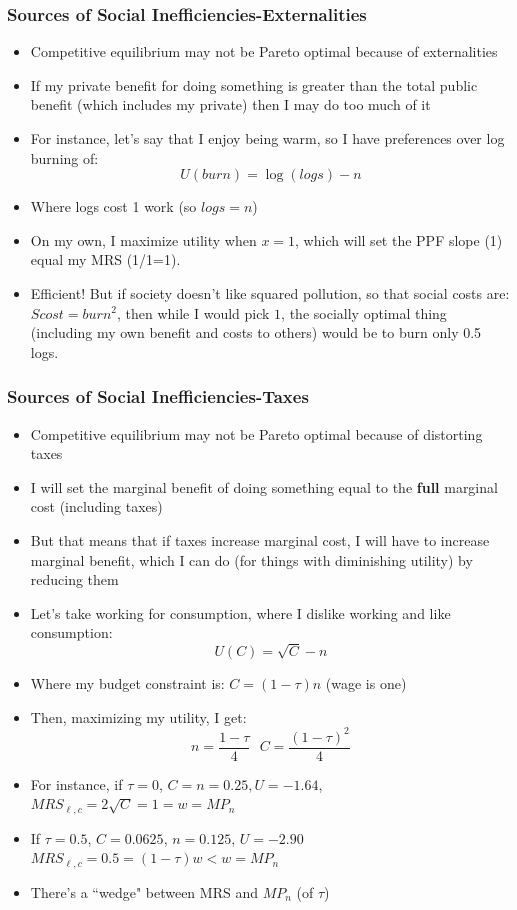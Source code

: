 \documentclass{beamer}
\begin{document}
\begin{frame}
\frametitle[alignment=center]{Sources of Social Inefficiencies-Externalities}
\begin{itemize}
\item Competitive equilibrium may not be Pareto optimal because of externalities 
\bigskip
\item If my private benefit for doing something is greater than the total public benefit (which includes my private) then I may do too much of it
\bigskip
\item For instance, let's say that I enjoy being warm, so I have preferences over log burning of:
$$U(burn)=\log(logs)-n$$
\item Where logs cost 1 work (so $logs=n$)
\bigskip
\item On my own, I maximize utility when $x=1$, which will set the PPF slope (1) equal my MRS (1/1=1).  
\bigskip
\item Efficient!  But if society doesn't like squared pollution, so that social costs are: $Scost=burn^2$, then while I would pick $1$, the socially optimal thing (including my own benefit and costs to others) would be to burn only 0.5 logs.  
\end{itemize}
\end{frame}

\begin{frame}
\frametitle[alignment=center]{Sources of Social Inefficiencies-Taxes}
\begin{itemize}
\item Competitive equilibrium may not be Pareto optimal because of distorting taxes 
\bigskip
\item I will set the marginal benefit of doing something equal to the \textbf{full} marginal cost (including taxes)
\bigskip
\item But that means that if taxes increase marginal cost, I will have to increase marginal benefit, which I can do (for things with diminishing utility) by reducing them
\bigskip
\item Let's take working for consumption, where I dislike working and like consumption:
$$U(C)=\sqrt{C}-n$$
\item Where my budget constraint is: $C=(1-\tau)n$ (wage is one)
\bigskip
\item Then, maximizing my utility, I get:
$$n=\frac{1-\tau}{4}\ \ \ C=\frac{(1-\tau)^2}{4}$$
\bigskip
\item For instance, if $\tau=0$, $C=n=0.25,U=-1.64$, $MRS_{\ell,c}=2\sqrt{C}=1=w=MP_n$
\item If $\tau=0.5$, $C=0.0625$, $n=0.125$, $U=-2.90$ $MRS_{\ell,c}=0.5=(1-\tau)w<w=MP_n$
\item There's a ``wedge" between MRS and $MP_n$ (of $\tau$)
\end{itemize}
\end{frame}
\end{document}

